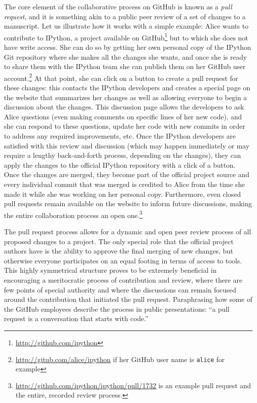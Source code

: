 \documentclass[11pt,oneside,english]{article}
\begin{document}
The core element of the collaborative process on GitHub is known as a
\emph{pull request}, and it is something akin to a public peer review of a set
of changes to a manuscript.  Let us illustrate how it works with a simple
example: Alice wants to contribute to IPython, a project available on
GitHub\footnote{\url{http://github.com/ipython}} but to which she does not have
write access. She can do so by getting her own personal copy of the IPython Git
repository where she makes all the changes she wants, and once she is ready to
share them with the IPython team she can publish them on her GitHub user
account.\footnote{\url{http://gitub.com/alice/ipython} if her GitHub user name
is \texttt{alice} for example}  At that point, she can click on a button to
create a pull request for these changes: this contacts the IPython developers
and creates a special page on the website that summarizes her changes as well
as allowing everyone to begin a discussion about the changes.  This discussion
page allows the developers to ask Alice questions (even making comments on
specific lines of her new code), and she can respond to these questions, update
her code with new commits in order to address any required improvements, etc.
Once the IPython developers are satisfied with this review and discussion
(which may happen immediately or may require a lengthy back-and-forth process,
depending on the changes), they can apply the changes to the official IPython
repository with a click of a button.  Once the changes are merged, they become
part of the official project source and every individual commit that was merged
is credited to Alice from the time she made it while she was working on her
personal copy.  Furthermore, even closed pull requests remain available on the
website to inform future discussions, making the entire collaboration process
an open one.\footnote{\url{http://github.com/ipython/ipython/pull/1732} is an
example pull request and the entire, recorded review process.}

The pull request process allows for a dynamic and open peer review process of
all proposed changes to a project.  The only special role that the official
project authors have is the ability to approve the final merging of new
changes, but otherwise everyone participates on an equal footing in terms of
access to tools.  This highly symmetrical structure proves to be extremely
beneficial in encouraging a meritocratic process of contribution and
review, where there are few points of special authority and where the
discussions can remain focused around the contribution that initiated the pull
request.  Paraphrasing how some of the GitHub employees describe the process in
public presentations: ``a pull request is a conversation that starts with
code.''
\end{document}
